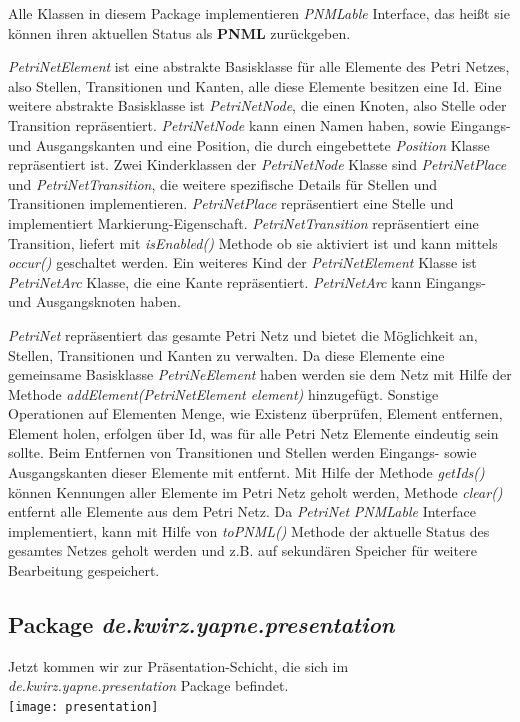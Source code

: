 \documentclass[12pt]{article}
\begin{document}
Alle Klassen in diesem Package implementieren \emph{PNMLable} Interface, das heißt sie können ihren aktuellen Status als \textbf{PNML} zurückgeben.

\emph{PetriNetElement} ist eine abstrakte Basisklasse für alle Elemente des Petri Netzes, also Stellen, Transitionen und Kanten, alle diese Elemente besitzen eine Id. Eine weitere abstrakte Basisklasse ist \emph{PetriNetNode}, die einen Knoten, also Stelle oder Transition repräsentiert. \emph{PetriNetNode} kann einen Namen haben, sowie Eingangs- und Ausgangskanten und eine Position, die durch eingebettete \emph{Position} Klasse repräsentiert ist. Zwei Kinderklassen der \emph{PetriNetNode} Klasse sind \emph{PetriNetPlace} und \emph{PetriNetTransition}, die weitere spezifische Details für Stellen und Transitionen implementieren. \emph{PetriNetPlace} repräsentiert eine Stelle und implementiert Markierung-Eigenschaft. \emph{PetriNetTransition} repräsentiert eine Transition, liefert mit \emph{isEnabled()} Methode ob sie aktiviert ist und kann mittels \emph{occur()} geschaltet werden. Ein weiteres Kind der \emph{PetriNetElement} Klasse ist \emph{PetriNetArc} Klasse, die eine Kante repräsentiert. \emph{PetriNetArc} kann Eingangs- und Ausgangsknoten haben.

\emph{PetriNet} repräsentiert das gesamte Petri Netz und bietet die Möglichkeit an, Stellen, Transitionen und Kanten zu verwalten. Da diese Elemente eine gemeinsame Basisklasse \emph{PetriNeElement} haben werden sie dem Netz mit Hilfe der Methode \emph{addElement(PetriNetElement element)} hinzugefügt. Sonstige Operationen auf Elementen Menge, wie Existenz überprüfen, Element entfernen, Element holen, erfolgen über Id, was für alle Petri Netz Elemente eindeutig sein sollte. Beim Entfernen von Transitionen und Stellen werden Eingangs- sowie Ausgangskanten dieser Elemente mit entfernt. Mit Hilfe der Methode \emph{getIds()} können Kennungen aller Elemente im Petri Netz geholt werden, Methode \emph{clear()} entfernt alle Elemente aus dem Petri Netz. Da \emph{PetriNet} \emph{PNMLable} Interface implementiert, kann mit Hilfe von \emph{toPNML()} Methode der aktuelle Status des gesamtes Netzes geholt werden und z.B. auf sekundären Speicher für weitere Bearbeitung gespeichert. 

\subsection{Package \emph{de.kwirz.yapne.presentation}}

Jetzt kommen wir zur Präsentation-Schicht, die sich im \emph{de.kwirz.yapne.presentation} Package befindet. \\
\texttt{[image: presentation]}
\end{document}
